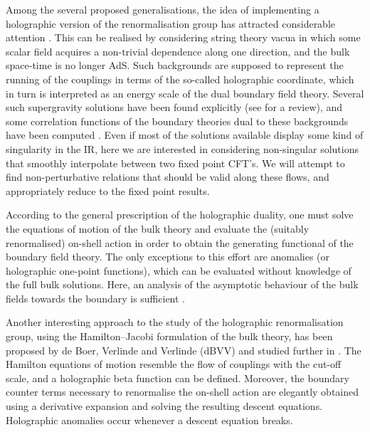 \documentclass[a4paper,12pt]{article}
\begin{document}
Among the several proposed generalisations, the idea of implementing a 
holographic version of the renormalisation group has attracted considerable 
attention
\cite{Akhmedov98,Balasubrasmanian99,Freedman99a,DeWolfe00a,Alvarez99,Anselmi00a,Bianchi00,Hambli00,Graham00,Warner00,Evans00}.
This can be realised by considering string theory vacua in which 
some scalar field acquires a non-trivial dependence along one
direction, and the bulk space-time is no longer AdS. 
Such backgrounds are supposed to represent the running of the
couplings in terms of the so-called holographic coordinate,
which in turn is interpreted as an energy scale of the dual boundary
field theory. Several such supergravity solutions have been found
explicitly \cite{Girardello99a,Freedman00b,Brandhuber99} (see \cite{Gubser00-1}
for a review), and some correlation functions of the boundary
theories dual to these backgrounds have been computed 
\cite{Chepelev99-1,Rashkov99-3,Anselmi00a,DeWolfe00a,Arutyunov00a,Bianchi00}.  
Even if most of the solutions available display some kind of singularity 
in the IR, here we are interested in considering non-singular solutions 
that smoothly interpolate between two fixed point CFT's. We will 
attempt to find non-perturbative relations that should be valid along
these flows, and appropriately reduce to the fixed point results. 



According to the general prescription of the holographic duality, one
must solve the equations of motion of the bulk theory and evaluate the
(suitably renormalised) on-shell action in order to obtain the 
generating functional of the boundary field theory. The only
exceptions to this effort are anomalies (or holographic one-point
functions), which can be evaluated without knowledge of the full bulk
solutions. Here, an analysis of the asymptotic behaviour of
the bulk fields towards the boundary is sufficient
\cite{Henningson98-2,deHaro00a,Schwimmer:2000cu,Manvelyan01}.

Another interesting approach to the study of the holographic
renormalisation group, using the Hamilton--Jacobi formulation of the
bulk theory, has been proposed by de Boer, Verlinde and
Verlinde (dBVV) \cite{deBoer00a,Verlinde00a,Verlinde00b,deBoer01a} and
studied further in
\cite{Campos00,Fukuma00a,Fukuma00b,Kalkkinen00,Nojiri00d,Kalkkinen01a}.  
The Hamilton equations of motion resemble the flow of couplings with the
cut-off scale, and a holographic beta function can be defined. 
Moreover, the boundary counter terms necessary to
renormalise the on-shell action are elegantly obtained using a
derivative expansion and solving the resulting descent
equations. Holographic anomalies occur whenever a descent equation 
breaks.
\end{document}
